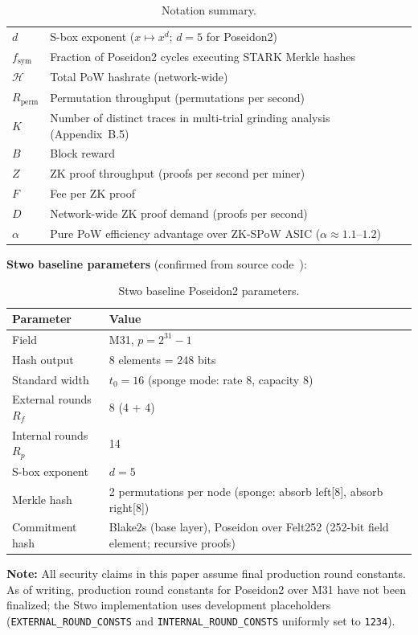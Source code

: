 \documentclass[11pt,a4paper]{article}
\begin{document}
\begin{table}[h]
\begin{tabular}{@{}ll@{}}
$d$ & S-box exponent ($x \mapsto x^d$; $d = 5$ for Poseidon2) \\
$f_{\mathrm{sym}}$ & Fraction of Poseidon2 cycles executing STARK Merkle hashes \\
$\mathcal{H}$ & Total PoW hashrate (network-wide) \\
$R_{\mathrm{perm}}$ & Permutation throughput (permutations per second) \\
$K$ & Number of distinct traces in multi-trial grinding analysis (Appendix~B.5) \\
$B$ & Block reward \\
$Z$ & ZK proof throughput (proofs per second per miner) \\
$F$ & Fee per ZK proof \\
$D$ & Network-wide ZK proof demand (proofs per second) \\
$\alpha$ & Pure PoW efficiency advantage over ZK-SPoW ASIC ($\alpha \approx 1.1$--$1.2$) \\
\bottomrule
\end{tabular}
\caption{Notation summary.}
\label{tab:notation}
\end{table}

\textbf{Stwo baseline parameters} (confirmed from source code~\cite{stwo}):

\begin{table}[h]
\centering
\begin{tabular}{@{}ll@{}}
\toprule
Parameter & Value \\
\midrule
Field & M31, $p = 2^{31}-1$ \\
Hash output & 8 elements = 248 bits \\
Standard width & $t_0 = 16$ (sponge mode: rate 8, capacity 8) \\
External rounds $R_f$ & 8 (4 + 4) \\
Internal rounds $R_p$ & 14 \\
S-box exponent & $d = 5$ \\
Merkle hash & 2 permutations per node (sponge: absorb left[8], absorb right[8]) \\
Commitment hash & Blake2s (base layer), Poseidon over Felt252 (252-bit field element; recursive proofs) \\
\bottomrule
\end{tabular}
\caption{Stwo baseline Poseidon2 parameters.}
\label{tab:stwo-baseline}
\end{table}

\textbf{Note:} All security claims in this paper assume final production round constants. As of writing, production round constants for Poseidon2 over M31 have not been finalized; the Stwo implementation uses development placeholders (\texttt{EXTERNAL\_ROUND\_CONSTS} and \texttt{INTERNAL\_ROUND\_CONSTS} uniformly set to \texttt{1234}).
\end{document}
